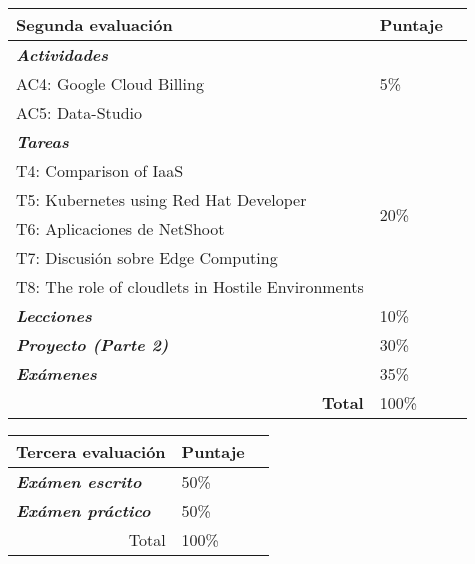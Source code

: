 \begin{table}[!htbp]
\begin{tabular}{p{}lc@{}}
\toprule
\textbf{Segunda evaluación}            & \multicolumn{1}{l}{\textbf{Puntaje}} \\ \midrule
\textit{\textbf{Actividades}}          & \multirow{3}{*}{5\%}                 \\
AC4:   Google Cloud Billing            &                                      \\
AC5:   Data-Studio                     &                                      \\ \midrule
\textit{\textbf{Tareas}}               & \multirow{6}{*}{20\%}                \\
T4: Comparison of IaaS                 &                                      \\
T5: Kubernetes using Red Hat Developer      &                                      \\
T6: Aplicaciones de NetShoot                           &                                      \\
T7: Discusión sobre Edge Computing                              &                                      \\ 
T8: The role of cloudlets in Hostile Environments                              &                                      \\ \midrule
\textit{\textbf{Lecciones}}            & 10\%                                 \\ \midrule
\textit{\textbf{Proyecto (Parte   2)}} & 30\%                                 \\ \midrule
\textit{\textbf{Exámenes}}             & 35\%                                 \\ \midrule
\multicolumn{1}{r}{\textbf{Total}}              & 100\%                                \\ \bottomrule
\end{tabular}
\end{table}

\begin{table}[htbp]
\begin{tabular}{p{}lc@{}}
\toprule
\textbf{Tercera evaluación}       & \multicolumn{1}{l}{\textbf{Puntaje}} \\ \midrule
\textit{\textbf{Exámen escrito}}  & 50\%                                 \\
\textit{\textbf{Exámen práctico}} & 50\%                                 \\ \midrule
\multicolumn{1}{r}{Total}         & 100\%                                \\ \bottomrule
\end{tabular}
\end{table}

\vfill